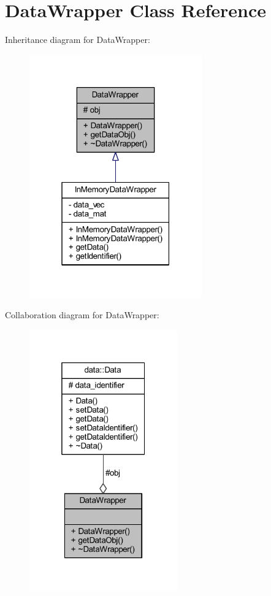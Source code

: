 \hypertarget{class_data_wrapper}{}\section{Data\+Wrapper Class Reference}
\label{class_data_wrapper}


Inheritance diagram for Data\+Wrapper\+:\nopagebreak
\begin{figure}[H]
\begin{center}
\leavevmode
\includegraphics[width=211pt]{class_data_wrapper__inherit__graph}
\end{center}
\end{figure}


Collaboration diagram for Data\+Wrapper\+:\nopagebreak
\begin{figure}[H]
\begin{center}
\leavevmode
\includegraphics[width=181pt]{class_data_wrapper__coll__graph}
\end{center}
\end{figure}
